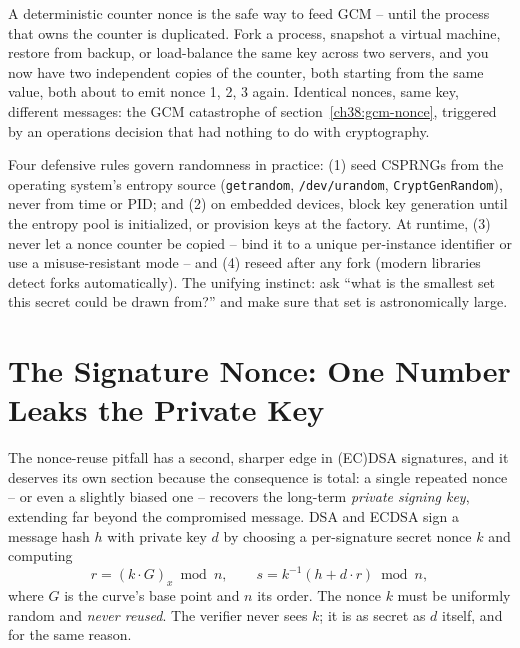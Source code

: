 A deterministic counter nonce is the safe way to feed GCM -- until the process that owns the counter is duplicated. Fork a process, snapshot a virtual machine, restore from backup, or load-balance the same key across two servers, and you now have two independent copies of the counter, both starting from the same value, both about to emit nonce 1, 2, 3 again. Identical nonces, same key, different messages: the GCM catastrophe of section~\ref{ch38:gcm-nonce}, triggered by an operations decision that had nothing to do with cryptography.

\begin{focusbox}
Four defensive rules govern randomness in practice: (1) seed CSPRNGs from the operating system's entropy source (\texttt{getrandom}, \texttt{/dev/urandom}, \texttt{CryptGenRandom}), never from time or PID; and (2) on embedded devices, block key generation until the entropy pool is initialized, or provision keys at the factory. At runtime, (3) never let a nonce counter be copied -- bind it to a unique per-instance identifier or use a misuse-resistant mode -- and (4) reseed after any fork (modern libraries detect forks automatically). The unifying instinct: ask ``what is the smallest set this secret could be drawn from?'' and make sure that set is astronomically large.
\end{focusbox}

\section{The Signature Nonce: One Number Leaks the Private Key}
\label{ch38:ecdsa-nonce}

The nonce-reuse pitfall has a second, sharper edge in (EC)DSA signatures, and it deserves its own section because the consequence is total: a single repeated nonce -- or even a slightly biased one -- recovers the long-term \emph{private signing key}, extending far beyond the compromised message. DSA and ECDSA sign a message hash $h$ with private key $d$ by choosing a per-signature secret nonce $k$ and computing
\[
r = (k\cdot G)_x \bmod n, \qquad s = k^{-1}(h + d\cdot r) \bmod n,
\]
where $G$ is the curve's base point and $n$ its order. The nonce $k$ must be uniformly random and \emph{never reused}. The verifier never sees $k$; it is as secret as $d$ itself, and for the same reason.

